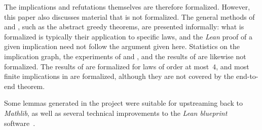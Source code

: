 The implications and refutations themselves are therefore formalized.  However, this paper also discusses material that is not formalized.  The general methods of  and , such as the abstract greedy theorems, are presented informally: what is formalized is typically their application to specific laws, and the \emph{Lean} proof of a given implication need not follow the argument given here.  Statistics on the implication graph, the experiments of  and , and the results of  are likewise not formalized.  The results of  are formalized for laws of order at most~$4$, and most finite implications in  are formalized, although they are not covered by the end-to-end theorem.

Some lemmas generated in the project were suitable for upstreaming back to \emph{Mathlib}, as well as several technical improvements to the \emph{Lean blueprint} software~\cite{leanblueprint}.
